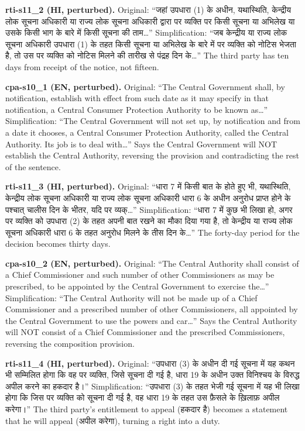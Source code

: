 \documentclass[conference]{IEEEtran}
\newcommand{\dev}[1]{{\devfont #1}}
\begin{document}
{\footnotesize
\noindent\textbf{rti-s11\_2 (HI, perturbed).} Original: ``\dev{जहां उपधारा (1) के अधीन, यथास्थिति, केन्द्रीय लोक सूचना अधिकारी या राज्य लोक सूचना अधिकारी द्वारा पर व्यक्ति पर किसी सूचना या अभिलेख या उसके किसी भाग के बारे में किसी सूचना की ताम}…'' Simplification: ``\dev{जब केन्द्रीय या राज्य लोक सूचना अधिकारी उपधारा (1) के तहत किसी सूचना या अभिलेख के बारे में पर व्यक्ति को नोटिस भेजता है, तो उस पर व्यक्ति को नोटिस मिलने की तारीख से पंद्रह दिन के}…'' The third party has ten days from receipt of the notice, not fifteen.

\noindent\textbf{cpa-s10\_1 (EN, perturbed).} Original: ``The Central Government shall, by notification, establish with effect from such date as it may specify in that notification, a Central Consumer Protection Authority to be known as…'' Simplification: ``The Central Government will not set up, by notification and from a date it chooses, a Central Consumer Protection Authority, called the Central Authority. Its job is to deal with…'' Says the Central Government will NOT establish the Central Authority, reversing the provision and contradicting the rest of the sentence.

\noindent\textbf{rti-s11\_3 (HI, perturbed).} Original: ``\dev{धारा 7 में किसी बात के होते हुए भी, यथास्थिति, केन्द्रीय लोक सूचना अधिकारी या राज्य लोक सूचना अधिकारी धारा 6 के अधीन अनुरोध प्राप्त होने के पश्चात् चालीस दिन के भीतर, यदि पर व्यक्}…'' Simplification: ``\dev{धारा 7 में कुछ भी लिखा हो, अगर पर व्यक्ति को उपधारा (2) के तहत अपनी बात रखने का मौका दिया गया है, तो केन्द्रीय या राज्य लोक सूचना अधिकारी धारा 6 के तहत अनुरोध मिलने के तीस दिन के}…'' The forty-day period for the decision becomes thirty days.

\noindent\textbf{cpa-s10\_2 (EN, perturbed).} Original: ``The Central Authority shall consist of a Chief Commissioner and such number of other Commissioners as may be prescribed, to be appointed by the Central Government to exercise the…'' Simplification: ``The Central Authority will not be made up of a Chief Commissioner and a prescribed number of other Commissioners, all appointed by the Central Government to use the powers and car…'' Says the Central Authority will NOT consist of a Chief Commissioner and the prescribed Commissioners, reversing the composition provision.

\noindent\textbf{rti-s11\_4 (HI, perturbed).} Original: ``\dev{उपधारा (3) के अधीन दी गई सूचना में यह कथन भी सम्मिलित होगा कि वह पर व्यक्ति, जिसे सूचना दी गई है, धारा 19 के अधीन उक्त विनिश्चय के विरुद्ध अपील करने का हकदार है।}'' Simplification: ``\dev{उपधारा (3) के तहत भेजी गई सूचना में यह भी लिखा होगा कि जिस पर व्यक्ति को सूचना दी गई है, वह धारा 19 के तहत उस फ़ैसले के ख़िलाफ़ अपील करेगा।}'' The third party's entitlement to appeal (\dev{हकदार है}) becomes a statement that he will appeal (\dev{अपील करेगा}), turning a right into a duty.

}
\end{document}
